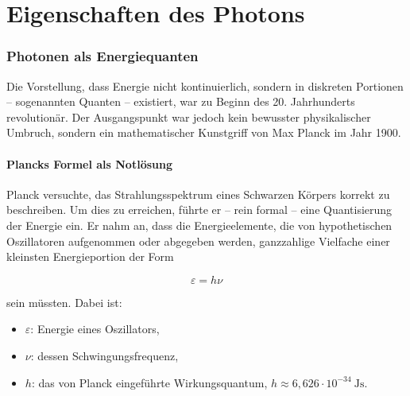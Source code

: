 \chapter{Eigenschaften des Photons}

\setcounter{section}{3}
\setcounter{subsection}{0}
\setcounter{subsubsection}{1}
\setcounter{secnumdepth}{3}

\subsection{Photonen als Energiequanten}

Die Vorstellung, dass Energie nicht kontinuierlich, sondern in diskreten Portionen – sogenannten Quanten – existiert, war zu Beginn des 20. Jahrhunderts revolutionär. Der Ausgangspunkt war jedoch kein bewusster physikalischer Umbruch, sondern ein mathematischer Kunstgriff von Max Planck im Jahr 1900.

\subsubsection{Plancks Formel als Notlösung}

Planck versuchte, das Strahlungsspektrum eines Schwarzen Körpers korrekt zu beschreiben. Um dies zu erreichen, führte er – rein formal – eine Quantisierung der Energie ein. Er nahm an, dass die Energieelemente, die von hypothetischen Oszillatoren aufgenommen oder abgegeben werden, ganzzahlige Vielfache einer kleinsten Energieportion der Form

\begin{equation}
	\varepsilon = h \nu
\end{equation}

sein müssten. Dabei ist:
\begin{itemize}
	\item $\varepsilon$: Energie eines Oszillators,
	\item $\nu$: dessen Schwingungsfrequenz,
	\item $h$: das von Planck eingeführte Wirkungsquantum, $h \approx 6{,}626 \cdot 10^{-34}~\mathrm{Js}$.
\end{itemize}

